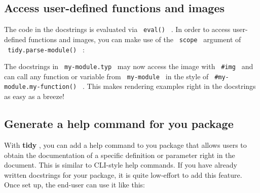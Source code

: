 \subsection{Access user-defined functions and
images}\label{access-user-defined-functions-and-images}

The code in the docstrings is evaluated via \texttt{\ eval()\ } . In
order to access user-defined functions and images, you can make use of
the \texttt{\ scope\ } argument of \texttt{\ tidy.parse-module()\ } :

\begin{Shaded}
\begin{Highlighting}[]
\NormalTok{\#\{}
\NormalTok{    )}
\NormalTok{\}}
\end{Highlighting}
\end{Shaded}

The docstrings in \texttt{\ my-module.typ\ } may now access the image
with \texttt{\ \#img\ } and can call any function or variable from
\texttt{\ my-module\ } in the style of
\texttt{\ \#my-module.my-function()\ } . This makes rendering examples
right in the docstrings as easy as a breeze!

\subsection{Generate a help command for you
package}\label{generate-a-help-command-for-you-package}

With \textbf{tidy} , you can add a help command to you package that
allows users to obtain the documentation of a specific definition or
parameter right in the document. This is similar to CLI-style help
commands. If you have already written docstrings for your package, it is
quite low-effort to add this feature. Once set up, the end-user can use
it like this:

\begin{Shaded}
\begin{Highlighting}[]

\end{Highlighting}
\end{Shaded}


